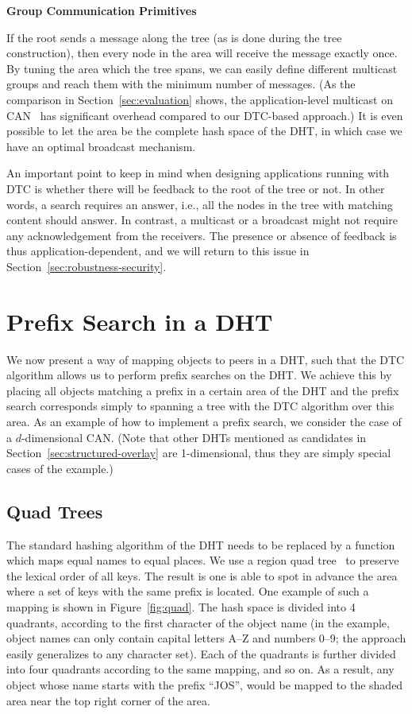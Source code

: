 \documentclass[fleqn,12pt,twoside]{article}
\begin{document}
\noindent
\textbf{Group Communication Primitives}

If the root sends a message along the tree (as is done during the tree
construction), then every node in the area will receive the message
exactly once. By tuning the area which the tree spans, we can easily
define different multicast groups and reach them with the minimum
number of messages. (As the comparison in Section~\ref{sec:evaluation}
shows, the application-level multicast on CAN~\cite{ratnasamy2001alm}
has significant overhead compared to our DTC-based approach.) It is
even possible to let the area be the complete hash space of the DHT,
in which case we have an optimal broadcast mechanism.

An important point to keep in mind when designing applications running
with DTC is whether there will be feedback to the root of the tree or
not. In other words, a search requires an answer, i.e., all the nodes
in the tree with matching content should answer. In contrast, a
multicast or a broadcast might not require any acknowledgement from
the receivers. The presence or absence of feedback is thus
application-dependent, and we will return to this issue in
Section~\ref{sec:robustness-security}. 

\section{Prefix Search in a DHT}
\label{sec:hashing}

We now present a way of mapping objects to peers in a DHT, such that
the DTC algorithm allows us to perform prefix searches on the DHT. We 
achieve this by placing all objects matching a
prefix in a certain area of the DHT and the prefix search corresponds
simply to spanning a tree with the DTC algorithm over this area. As an
example of how to implement a prefix search, we consider the case of a
$d$-dimensional CAN. (Note that other DHTs mentioned as candidates in
Section~\ref{sec:structured-overlay} are 1-dimensional, thus they are
simply special cases of the example.)

\subsection{Quad Trees}
\label{sec:quad-trees}

The standard hashing algorithm of the DHT needs to be replaced by a
function which maps equal names to equal places. We use a region quad
tree~\cite{samet1984qar} to preserve the lexical order of all keys.
The result is one is able to spot in advance the area where a set
of keys with the same prefix is located. One example of such a mapping
is shown in Figure~\ref{fig:quad}. The hash space is divided into 4
quadrants, according to the first character of the object name (in the
example, object names can only contain capital letters A--Z and
numbers 0--9; the approach easily generalizes to any character set).
Each of the quadrants is further divided into four quadrants according
to the same mapping, and so on. As a result, any object whose name
starts with the prefix ``JOS'', would be mapped to the shaded area
near the top right corner of the area.
\end{document}
